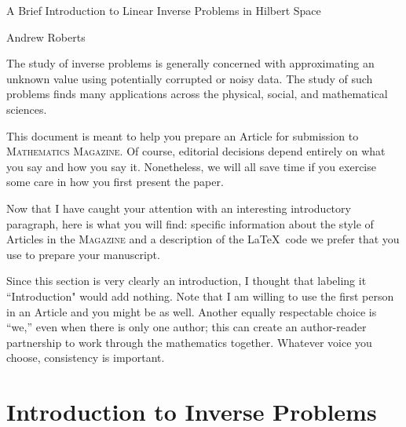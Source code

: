 \documentclass[12pt]{article}
\begin{document}
\begin{center}
\Large
A Brief Introduction to Linear Inverse Problems in Hilbert Space
\end{center}

\begin{flushright}
Andrew Roberts
\end{flushright} 

The study of inverse problems is generally concerned with approximating 
an unknown value using potentially corrupted or noisy data. The study of 
such problems finds many applications across the physical, social, and 
mathematical sciences. 

This document is meant to help you prepare an Article for
submission to \textsc{Mathematics Magazine}.  Of course,
editorial decisions depend entirely on
what you say and how you say it. Nonetheless, we will all save
time if you exercise some care in how you first present the paper.

Now that I have caught your attention with an interesting introductory paragraph,
here is what you will find:
specific information about the style of Articles in the \textsc{Magazine}
and a description of the \LaTeX\ code we prefer that you use
to prepare your manuscript.

Since this section is very clearly
an introduction, I thought that labeling it ``Introduction" would add
nothing.  Note that I am willing to use the first person in an Article
and you might be as well.  Another equally respectable choice is ``we,''
even when there is only one author; this can
create an author-reader partnership to
work through the mathematics together.
Whatever voice you choose, consistency is important.


\section{Introduction to Inverse Problems} 
\end{document}
